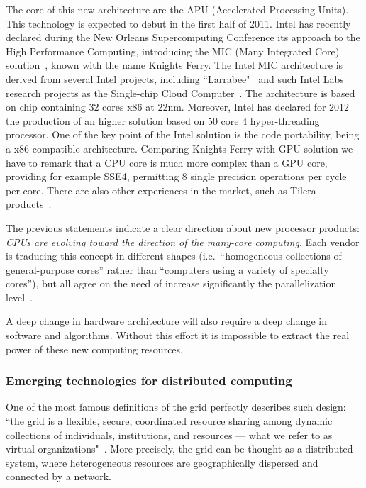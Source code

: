 The core of this new architecture are the APU (Accelerated Processing Units).
This technology is expected to debut in the first half of 2011.
Intel has recently declared during the New Orleans Supercomputing 
Conference its approach to the High Performance Computing,
introducing the MIC (Many Integrated Core) solution~\cite{intelmic}, 
known with the name Knights Ferry. The Intel MIC architecture is 
derived from several Intel projects, including ``Larrabee"~\cite{larrabee} 
and such Intel Labs research projects as the Single-chip Cloud 
Computer~\cite{intelscc,intelsccp}.  The architecture is based on 
chip containing 32 cores x86 at 22nm. Moreover, Intel has declared 
for 2012 the production of an higher solution based on 50 core 
4 hyper-threading processor. One of the key point of the Intel 
solution is the code portability, being a x86 compatible architecture. 
Comparing Knights Ferry  with GPU solution we have to remark that 
a CPU core is much more complex than a GPU core, providing for 
example SSE4, permitting 8 single precision operations per cycle 
per core. There are also other experiences in the market, such 
as Tilera products~\cite{Tilera}.  

The previous  statements indicate a clear direction about new 
processor products: {\em CPUs are evolving toward the direction 
of the many-core computing}. Each vendor is traducing this concept 
in different shapes (i.e.\ ``homogeneous collections of 
general-purpose cores'' rather than ``computers using a variety 
of specialty cores''), but all agree on the need of increase 
significantly the parallelization level~\cite{intelterascale}.

A deep change in hardware architecture will also require a deep 
change in software and algorithms. Without this effort it is 
impossible to extract the real power of these new computing 
resources.

\subsubsection{Emerging technologies for distributed computing}
\label{sec:gridcloudcomp}
One of the most famous
definitions of the grid perfectly describes such design: ``the grid is a
flexible, secure, coordinated resource sharing among dynamic collections
of individuals, institutions, and resources --- what we refer to as
virtual organizations"~\cite{anatomy_grid}. 
More precisely, the grid can be thought as a distributed system, where 
heterogeneous resources are geographically dispersed and connected by a network.

